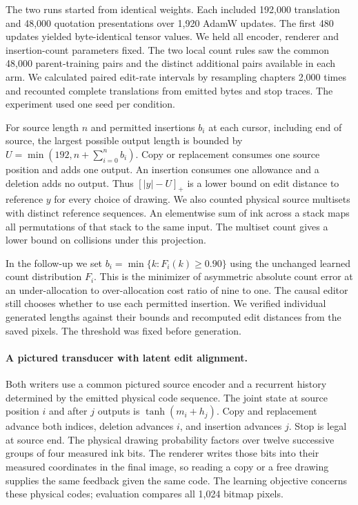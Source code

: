 \documentclass[12pt,a4paper]{article}
\providecommand{\DIFadd}[1]{{\protect\color{blue} \sf #1}} %
\begin{document}
\DIFadd{The two runs started from identical weights. Each included 192,000 translation and 48,000 quotation presentations over 1,920 AdamW updates. The first 480 updates yielded byte-identical tensor values. We held all encoder, renderer and insertion-count parameters fixed. The two local count rules saw the common 48,000 parent-training pairs and the distinct additional pairs available in each arm. We calculated paired edit-rate intervals by resampling chapters 2,000 times and recounted complete translations from emitted bytes and stop traces. The experiment used one seed per condition.
}

\DIFadd{For source length $n$ and permitted insertions $b_i$ at each cursor, including end of source, the largest possible output length is bounded by $U=\min(192,n+\sum_{i=0}^{n} b_i)$. Copy or replacement consumes one source position and adds one output. An insertion consumes one allowance and a deletion adds no output. Thus $[|y|-U]_+$ is a lower bound on edit distance to reference $y$ for every choice of drawing. We also counted physical source multisets with distinct reference sequences. An elementwise sum of ink across a stack maps all permutations of that stack to the same input. The multiset count gives a lower bound on collisions under this projection.
}

\DIFadd{In the follow-up we set $b_i=\min\{k:F_i(k)\geq0.90\}$ using the unchanged learned count distribution $F_i$. This is the minimizer of asymmetric absolute count error at an under-allocation to over-allocation cost ratio of nine to one. The causal editor still chooses whether to use each permitted insertion. We verified individual generated lengths against their bounds and recomputed edit distances from the saved pixels. The threshold was fixed before generation.
}

\paragraph{\DIFadd{A pictured transducer with latent edit alignment.}}
\DIFadd{Both writers use a common pictured source encoder and a recurrent history determined by the emitted physical code sequence. The joint state at source position $i$ and after $j$ outputs is $\tanh(m_i+h_j)$. Copy and replacement advance both indices, deletion advances $i$, and insertion advances $j$. Stop is legal at source end. The physical drawing probability factors over twelve successive groups of four measured ink bits. The renderer writes those bits into their measured coordinates in the final image, so reading a copy or a free drawing supplies the same feedback given the same code. The learning objective concerns these physical codes; evaluation compares all 1,024 bitmap pixels.
}
\end{document}
